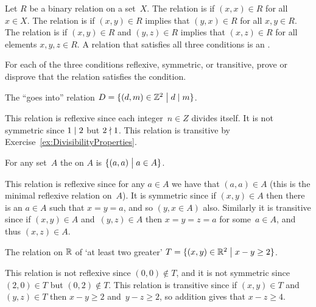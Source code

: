 \documentclass{ibl}  %
\begin{document}
\begin{df} 
Let $R$ be a binary relation on a set~$X$.
The relation is  if $(x,x)\in R$ for all $x\in X$.
The relation is  if $(x,y)\in R$ implies that
$(y,x)\in R$ for all $x,y\in R$.
The relation is  if 
$(x,y)\in R$ and $(y,z)\in R$ implies that 
$(x,z)\in R$ for all elements $x,y,z\in R$.
A relation that satisfies all three conditions is an
.  
\end{df}

\begin{problem} 
  For each of the three conditions reflexive, symmetric, 
  or transitive,
  prove or disprove that the relation satisfies the condition.
\begin{exes}
\begin{exercise} 
  The ``goes into'' relation
  $D=\{(d,m)\in\mathbb{Z}^2 \bigm| d\mid m\}$.
\end{exercise}
\begin{answer}
  This relation is reflexive since each integer~$n\in Z$ 
  divides itself.
  It is not symmetric since $1\mid 2$ but $2\nmid 1$.
  This relation is transitive by Exercise~\ref{ex:DivisibilityProperties}.
\end{answer}
\begin{exercise}
  For any set~$A$ the  on $A$ 
  is $\{(a,a) \bigm| a\in A\}$. 
\end{exercise}
\begin{answer}
  This relation is reflexive since for any $a\in A$ we have that
  $(a,a)\in A$ (this is the minimal reflexive relation on~$A$).
  It is symmetric since if $(x,y)\in A$ then there is an
  $a\in A$ such that $x=y=a$, and so $(y,x\in A)$ also.
  Similarly it is transitive since if 
  $(x,y)\in A$ and~$(y,z)\in A$ then $x=y=z=a$ for some~$a\in A$, and
  thus $(x,z)\in A$.
\end{answer}
\begin{exercise}[\midlength]
  The relation on $\mathbb{R}$ of `at least two greater'
  $T=\{(x,y)\in \mathbb{R}^2 \bigm| x-y\geq 2\}$.
\end{exercise}
\begin{answer}
  This relation is not reflexive since $(0,0)\notin T$,
  and it is not symmetric since $(2,0)\in T$ but 
  $(0,2)\notin T$.
  This relation is transitive since if $(x,y)\in T$ and $(y,z)\in T$ 
  then $x-y\geq 2$ and~$y-z\geq 2$, so addition gives that $x-z\geq 4$.
\end{answer}

\end{exes}
\end{problem}
\end{document}
